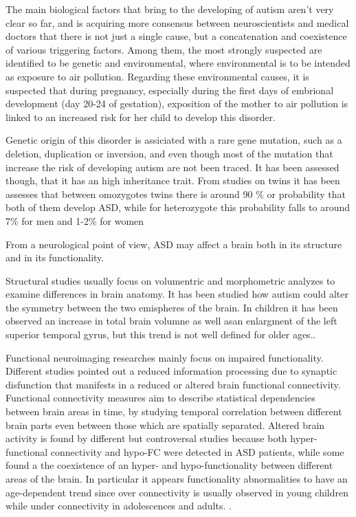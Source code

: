 \documentclass[11pt]{report}
\begin{document}
The main biological factors that bring to the developing of autism aren't very clear so far, and is acquiring more consensus between neuroscientists and medical doctors that there is not just a single cause, but a concatenation and coexistence of various triggering factors.
Among them, the most strongly suspected are identified to be genetic and environmental, where environmental is to be intended as exposure to air pollution.
Regarding these environmental causes, it is suspected that during pregnancy, especially during the first days of embrional development (day 20-24 of gestation), exposition of the mother to air pollution is linked to an increased risk for her child to develop this disorder.\cite{ratajczak-2011}

Genetic origin of this disorder is assiciated with a rare gene mutation, such as a deletion, duplication or inversion, and even though most of the mutation that increase the risk of developing autism are not been traced.
It has been assessed though, that it has an high inheritance trait. From studies on twins it has been assesses that between omozygotes twins there is around 90 \% or probability that both of them develop ASD, while for heterozygote this probability falls to around 7\% for men and 1-2\% for women
\cite{freitag-2007}

From a neurological point of view, ASD may affect a brain both in its structure and in its functionality.

Structural studies usually focus on volumentric and morphometric analyzes to examine differences in brain anatomy.
It has been studied how autism could alter the symmetry between the two emispheres \cite{postema2019} of the brain. In children it has been observed an increase in total brain volumne as well asan enlargment of the left superior temporal gyrus, but this trend is not well defined for older ages.\cite{riddle-2017}.


Functional neuroimaging researches mainly focus on impaired functionality. Different studies pointed out a reduced information processing due to synaptic disfunction that manifests in a reduced or altered brain functional connectivity.
Functional connectivity measures aim to describe statistical dependencies between brain areas in time, by studying temporal correlation between different brain parts even between those which are spatially separated.
Altered brain activity is found by different but controversal studies because both hyper- functional connectivity and hypo-FC were detected in ASD patients, while some found a the coexistence of an hyper- and hypo-functionality between different areas of the brain.
In particular it appears functionality abnormalities to have an age-dependent trend since over connectivity is usually observed in young children while under connectivity in adolescences and adults.\cite{supekar-2013} \cite{spera-2019}.
\end{document}
